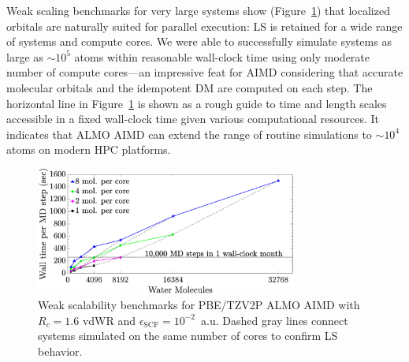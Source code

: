 \documentclass[aps,prl,reprint,amsmath,amssymb]{revtex4-1}
\begin{document}

Weak scaling benchmarks for very large systems show (Figure~\ref{fig:weakscaling}) that localized orbitals are naturally suited for parallel execution: LS is retained for a wide range of systems and compute cores. 
We were able to successfully simulate systems as large as $\sim10^{5}$ atoms 
within reasonable wall-clock time using only moderate number of compute cores---an impressive feat for AIMD considering that accurate molecular orbitals and the idempotent DM are computed on each step.
The horizontal line in Figure~\ref{fig:weakscaling} is shown as a rough guide to time and length scales accessible in a fixed wall-clock time given various computational resources. It indicates that ALMO AIMD can extend the range of routine simulations to $\sim10^4$ atoms on modern HPC platforms. 



\begin{figure}
\includegraphics[trim={1.6cm 0.8cm 4.7cm 0cm},clip,width=8.6cm]{weakscaling.eps}
\caption{\label{fig:weakscaling} Weak scalability benchmarks for PBE/TZV2P ALMO AIMD with  $R_{c} = 1.6$ vdWR and $\epsilon_{\text{SCF}} = 10^{-2}$~a.u. 
Dashed gray lines connect systems simulated on the same number of cores to confirm LS behavior. %
}
\end{figure}

\end{document}
